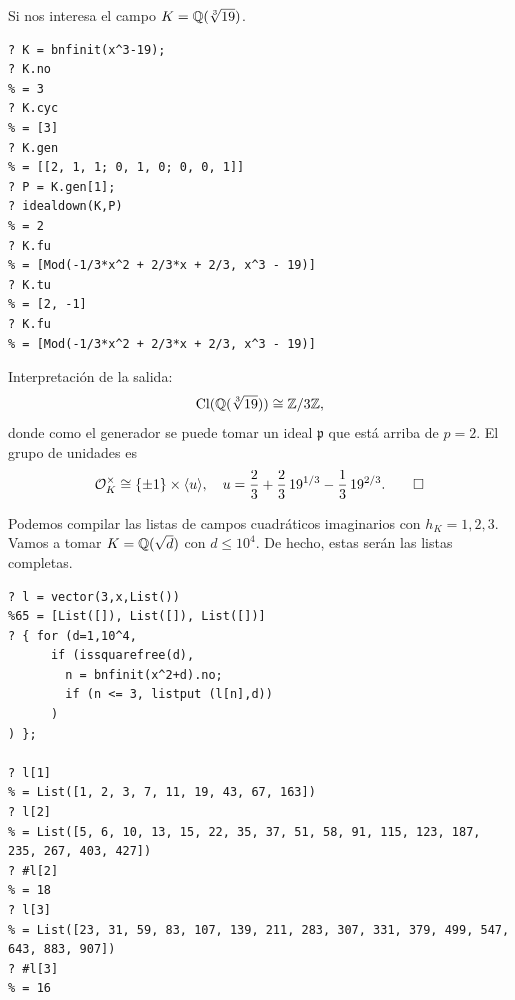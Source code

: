 \begin{ejemplo}
  Si nos interesa el campo $K = \mathbb{Q} (\sqrt[3]{19})$.

  \begin{shaded}
\begin{verbatim}
? K = bnfinit(x^3-19);
? K.no
% = 3
? K.cyc
% = [3]
? K.gen
% = [[2, 1, 1; 0, 1, 0; 0, 0, 1]]
? P = K.gen[1];
? idealdown(K,P)
% = 2
? K.fu
% = [Mod(-1/3*x^2 + 2/3*x + 2/3, x^3 - 19)]
? K.tu
% = [2, -1]
? K.fu
% = [Mod(-1/3*x^2 + 2/3*x + 2/3, x^3 - 19)]
\end{verbatim}
  \end{shaded}

  Interpretación de la salida:
  $$\operatorname{Cl} (\mathbb{Q} (\sqrt[3]{19})) \cong \mathbb{Z}/3\mathbb{Z},$$
  donde como el generador se puede tomar un ideal $\mathfrak{p}$ que está arriba
  de $p = 2$. El grupo de unidades es
  \[ \mathcal{O}_K^\times \cong \{ \pm 1 \} \times \langle u\rangle, \quad
      u = \frac{2}{3} + \frac{2}{3}\,19^{1/3} - \frac{1}{3}\,19^{2/3}. \qedhere \]
\end{ejemplo}

\begin{ejemplo}
  Podemos compilar las listas de campos cuadráticos imaginarios con
  $h_K = 1,2,3$. Vamos a tomar $K = \mathbb{Q} (\sqrt{d})$ con $d \le 10^4$. De hecho,
  estas serán las listas completas.

  \begin{shaded}\small
\begin{verbatim}
? l = vector(3,x,List())
%65 = [List([]), List([]), List([])]
? { for (d=1,10^4,
      if (issquarefree(d),
        n = bnfinit(x^2+d).no;
        if (n <= 3, listput (l[n],d))
      )
) };

? l[1]
% = List([1, 2, 3, 7, 11, 19, 43, 67, 163])
? l[2]
% = List([5, 6, 10, 13, 15, 22, 35, 37, 51, 58, 91, 115, 123, 187, 235, 267, 403, 427])
? #l[2]
% = 18
? l[3]
% = List([23, 31, 59, 83, 107, 139, 211, 283, 307, 331, 379, 499, 547, 643, 883, 907])
? #l[3]
% = 16
\end{verbatim}
  \end{shaded}
\end{ejemplo}


